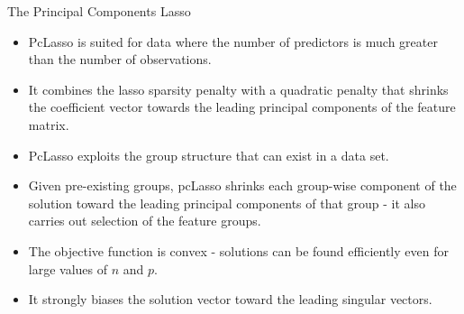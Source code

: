 \documentclass[8pt]{beamer}
\begin{document}
\begin{frame}{The Principal Components Lasso}

\begin{itemize}
    \item PcLasso is suited for data where the number of predictors is much greater than the number of observations.
    
    \item It combines the lasso sparsity penalty with a quadratic penalty that shrinks the coefficient vector towards the leading principal components of the feature matrix.
    
    \item PcLasso exploits the group structure that can exist in a data set.
    
    \item Given pre-existing groups, pcLasso shrinks each group-wise
    component of the solution toward the leading principal components of that group - it also carries out selection of the feature groups. 
    
    \item The objective function is convex - solutions can be found efficiently even for large values of $n$ and $p$.
    
    \item It strongly biases the solution vector toward the leading singular vectors.
\end{itemize}   
\end{frame}
\end{document}
